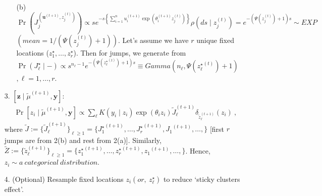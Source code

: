 \documentclass[10pt, oneside]{article}   	%
\renewcommand{\th}{\theta}
\newcommand{\ub}{\mathbf{u}}
\begin{document}
\begin{enumerate}
\begin{itemize}
 \item[(b)] $\Pr\left(J^{\left({\ub}^{(t+1)}, z^{(t)}_j\right)}_j\right) \propto s e^{-s \left\{\sum_{i=1}^n u^{(t+1)}_i \exp(\th^{(t+1)}_i z^{(t)}_j)\right\}} \rho(ds \mid z^{(t)}_j) =  e^{- \left(\Psi\left(z^{(t)}_j\right) +1\right) s} \sim EXP$ $\left(mean = 1\bigg/\left(\Psi\left(z^{(t)}_j\right) +1\right)\right)$. Let's assume we have $r$ unique fixed locations ($z^\star_1, \dots, z^\star_r$). Then for jumps, we generate from $\Pr(J^\star_\ell \mid -)\propto s^{n_\ell - 1}  e^{- \left(\Psi\left({z^\star_\ell}^{(t)}\right) +1\right) s} \equiv Gamma\left(n_\ell,  \Psi\left({z^\star_\ell}^{(t)}\right) +1\right)$ $, \ell = 1, \dots, r$.
\end{itemize}
\item[3.] $[\mathbf{z} \mid {\widetilde \mu}^{(t+1)}, \mathbf{y}]:$ 
\begin{eqnarray*}
\Pr[z_i \mid {\widetilde \mu}^{(t+1)}, \mathbf{y}] \propto \sum_{\ell} K(y_i \mid z_i) \exp(\theta_i z_i) {\widetilde{J}}^{(t+1)}_\ell \delta_{{\widetilde z}^{(t+1)}_\ell}(z_i)\ ,
\end{eqnarray*} 
where $\widetilde J := \{{\widetilde{J}}^{(t+1)}_\ell \}_{\ell \geq 1} = \{{J^\star_1}^{(t+1)}, \dots,  {J^\star_r}^{(t+1)}, {J_1}^{(t+1)}, \dots, \}$ [first $r$ jumps are from 2(b) and rest from 2(a)]. Similarly, $\widetilde Z := \{{\widetilde z}^{(t+1)}_\ell\}_{\ell \geq 1} = \{{z^\star_1}^{(t+1)}, \dots,  {z^\star_r}^{(t+1)}, {z_1}^{(t+1)}, \dots, \}$. Hence, $z_i \sim a \ categorical \ distribution$.
\item[4.] (Optional) Resample fixed locations $z_i (or, \ z^\star_\ell)$ to reduce `sticky clusters effect'. 
\end{enumerate}
\end{document}
